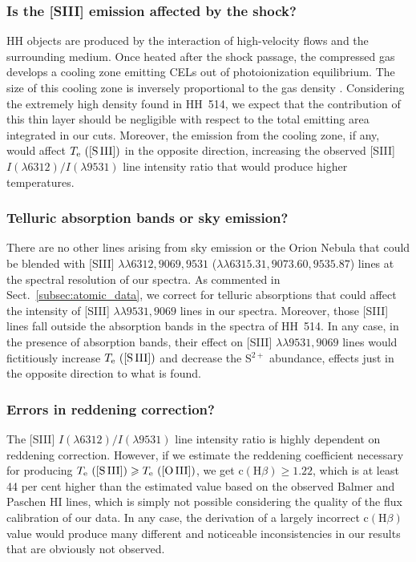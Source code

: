 \documentclass[fleqn,usenatbib]{mnras}
\begin{document}
\subsubsection{Is the [S\thinspace III] emission affected by the shock?}
\label{subsec:shock_affected}

HH objects are produced by the interaction of high-velocity flows and the surrounding medium. Once heated after the shock passage, the compressed gas develops a cooling zone emitting CELs out of photoionization equilibrium. The size of this cooling zone is inversely proportional to the gas density \citep[][]{Hartigan87}. Considering the extremely high density found in HH~514, we expect that the contribution of this thin layer should be negligible with respect to the total emitting area integrated in our cuts. Moreover, the emission from the cooling zone, if any, would affect $T_{\rm e} \text{ ([S\thinspace III])}$ in the opposite direction, increasing the observed [S\thinspace III] $I(\lambda 6312)/I(\lambda 9531)$ line intensity ratio that would produce higher temperatures.   

\subsubsection{Telluric absorption bands or sky emission?}
\label{subsec:tell_abs_sky_emmision}

There are no other lines arising from  sky emission or the Orion Nebula that could be blended with [S\thinspace III] $\lambda \lambda 6312, 9069, 9531$ ($\lambda \lambda 6315.31,9073.60, 9535.87$) lines at the spectral resolution of our spectra. As commented in Sect.~\ref{subsec:atomic_data}, we correct for telluric absorptions that could affect the intensity of [S\thinspace III] $\lambda \lambda 9531, 9069$ lines in our spectra. Moreover, those [S\thinspace III] lines fall outside the absorption bands in  the spectra of HH~514. In any case, in the presence of absorption bands, their effect on [S\thinspace III] $\lambda \lambda 9531, 9069$ lines would fictitiously increase $T_{\rm e} \text{ ([S\thinspace III])}$ and decrease the S$^{2+}$ abundance, effects just in the opposite direction to what is found.

\subsubsection{Errors in reddening correction?}
\label{subsec:errors_CHB}

The [S\thinspace III] $I(\lambda 6312)/I(\lambda 9531)$ line intensity ratio is highly dependent on reddening correction. However, if we estimate the reddening coefficient necessary for producing $T_{\rm e} \text{ ([S\thinspace III])} \geq T_{\rm e} \text{ ([O\thinspace III])}$, we get $\text{c}(\text{H}\beta)\geq 1.22$, which is at least 44 per cent higher than the estimated value based on the observed Balmer and Paschen H\thinspace I lines, which is simply not possible considering the quality of the flux calibration of our data. In any case, the derivation of a largely incorrect $\text{c}(\text{H}\beta)$ value would produce many different and noticeable inconsistencies in our results that are obviously not observed. 
\end{document}
